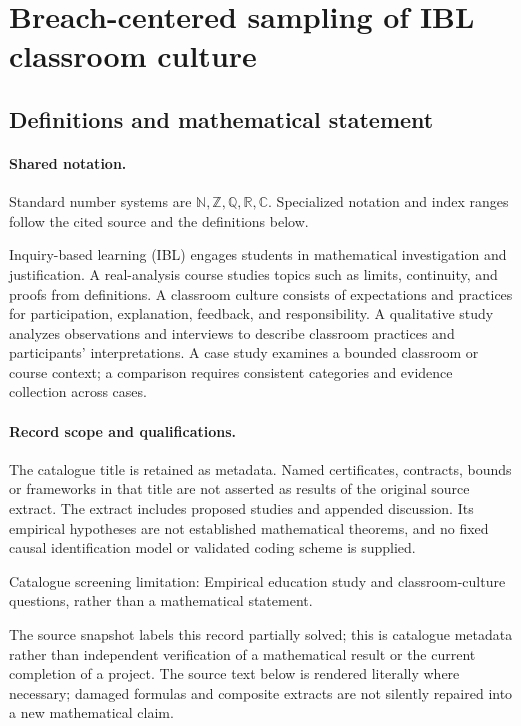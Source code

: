 \documentclass[11pt]{article}
\begin{document}
\section{Breach-centered sampling of IBL classroom culture}\label{statement}

\subsection{Definitions and mathematical statement}

\paragraph{Shared notation.}Standard number systems are $\mathbb N,\mathbb Z,\mathbb Q,\mathbb R,\mathbb C$. Specialized notation and index ranges follow the cited source and the definitions below.


Inquiry-based learning (IBL) engages students in mathematical investigation and justification. A real-analysis course studies topics such as limits, continuity, and proofs from definitions. A classroom culture consists of expectations and practices for participation, explanation, feedback, and responsibility. A qualitative study analyzes observations and interviews to describe classroom practices and participants' interpretations. A case study examines a bounded classroom or course context; a comparison requires consistent categories and evidence collection across cases.
\paragraph{Record scope and qualifications.}
The catalogue title is retained as metadata. Named certificates, contracts, bounds or frameworks in that title are not asserted as results of the original source extract.
The extract includes proposed studies and appended discussion. Its empirical hypotheses are not established mathematical theorems, and no fixed causal identification model or validated coding scheme is supplied.

Catalogue screening limitation: Empirical education study and classroom-culture questions, rather than a mathematical statement.

The source snapshot labels this record partially solved; this is catalogue metadata rather than independent verification of a mathematical result or the current completion of a project.
The source text below is rendered literally where necessary; damaged formulas and composite extracts are not silently repaired into a new mathematical claim.
\end{document}
